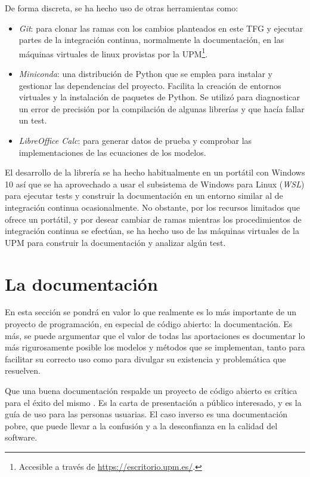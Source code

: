 De forma discreta, se ha hecho uso de otras herramientas como:

\begin{itemize}
    \item \textit{Git}: para \gls{clonar} las ramas con los cambios planteados en este TFG y ejecutar partes de la integración continua, normalmente la documentación, en las máquinas virtuales de linux provistas por la UPM\footnote{Accesible a través de \url{https://escritorio.upm.es/}.}.
    \item \textit{Miniconda}: una distribución de Python que se emplea para instalar y gestionar las dependencias del proyecto. Facilita la creación de entornos virtuales y la instalación de paquetes de Python. Se utilizó para diagnosticar un error de precisión por la compilación de algunas librerías y que hacía fallar un test.
    \item \textit{LibreOffice Calc}: para generar datos de prueba y comprobar las implementaciones de las ecuaciones de los modelos.
\end{itemize}

El desarrollo de la librería se ha hecho habitualmente en un portátil con Windows 10 así que se ha aprovechado a usar el subsistema de Windows para Linux (\textit{WSL}) para ejecutar tests y construir la documentación en un entorno similar al de integración continua ocasionalmente. No obstante, por los recursos limitados que ofrece un portátil, y por desear cambiar de ramas mientras los procedimientos de integración continua se efectúan, se ha hecho uso de las máquinas virtuales de la UPM para construir la documentación y analizar algún test.

\section{La documentación}

En esta sección se pondrá en valor lo que realmente es lo más importante de un proyecto de programación, en especial de código abierto: la \gls{documentación}. Es más, se puede argumentar que el valor de todas las aportaciones es documentar lo más rigurosamente posible los modelos y métodos que se implementan, tanto para facilitar su correcto uso como para divulgar su existencia y problemática que resuelven.

Que una buena documentación respalde un proyecto de código abierto es crítica para el éxito del mismo \cite{Imani_Radmanesh_Ahmed_Moshirpour_2024}. Es la carta de presentación a público interesado, y es la guía de uso para las personas usuarias. El caso inverso es una documentación pobre, que puede llevar a la confusión y a la desconfianza en la calidad del software.

